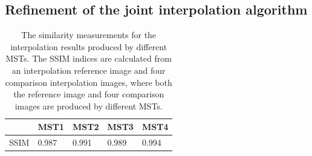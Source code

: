 \documentclass[preprint,10pt,5p,times,twocolumn]{elsarticle}
\begin{document}
\subsection{Refinement of the joint interpolation algorithm}


%
\begin{table}[t]
\centering
\begin{tabular}{|l|l|l|l|l|}
\hline
     & MST1 & MST2 & MST3 & MST4 \\ \hline
SSIM &  0.987    &   0.991   &  0.989    &  0.994    \\ \hline
\end{tabular}
\caption{The similarity measurements for the interpolation results produced by different MSTs. The SSIM indices are calculated from an interpolation reference image and four comparison interpolation images, where both the reference image and four comparison images are produced by different MSTs.}
\label{tab:SSIM}
\end{table}
%
\end{document}
